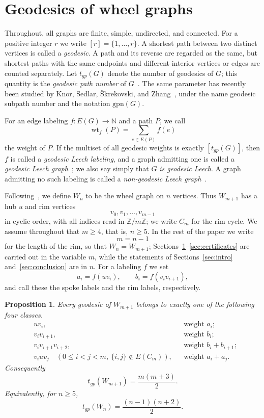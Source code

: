 \documentclass[11pt]{article}
\newtheorem{proposition}[theorem]{Proposition}
\theoremstyle{definition}
\theoremstyle{remark}
\numberwithin{equation}{section}
\newcommand{\N}{\mathbb{N}}
\newcommand{\Z}{\mathbb{Z}}
\newcommand{\wt}{\operatorname{wt}}
\begin{document}
\section{Geodesics of wheel graphs}\label{sec:wheels}

Throughout, all graphs are finite, simple, undirected, and connected. For a positive integer $r$ we write $[r]=\{1,\ldots,r\}$. A shortest path between two distinct vertices is called a \emph{geodesic}. A path and its reverse are regarded as the same, but shortest paths with the same endpoints and different interior vertices or edges are counted separately. Let $t_{gp}(G)$ denote the number of geodesics of $G$; this quantity is the \emph{geodesic path number} of $G$~\cite{VargheseEtAl2022,LakshmananManattu2025}. The same parameter has recently been studied by Knor, Sedlar, \v{S}krekovski, and Zhang~\cite{KnorEtAl2026}, under the name geodesic subpath number and the notation $\mathrm{gpn}(G)$.

For an edge labeling $f:E(G)\to\N$ and a path $P$, we call
\[
  \wt_f(P)=\sum_{e\in E(P)}f(e)
\]
the weight of $P$. If the multiset of all geodesic weights is exactly $[t_{gp}(G)]$, then $f$ is called a \emph{geodesic Leech labeling}, and a graph admitting one is called a \emph{geodesic Leech graph}~\cite{VargheseEtAl2022}; we also say simply that $G$ \emph{is geodesic Leech}. A graph admitting no such labeling is called a \emph{non-geodesic Leech graph}~\cite{LakshmananManattu2025}.

Following~\cite{LakshmananManattu2025}, we define $W_n$ to be the wheel graph on $n$ vertices. Thus $W_{m+1}$ has a hub $u$ and rim vertices
\[
  v_0,v_1,\ldots,v_{m-1}
\]
in cyclic order, with all indices read in $\Z/m\Z$; we write $C_m$ for the rim cycle. We assume throughout that $m\ge4$, that is, $n\ge5$. In the rest of the paper we write
\[
  m=n-1
\]
for the length of the rim, so that $W_n=W_{m+1}$; Sections~\ref{sec:wheels}--\ref{sec:certificates} are carried out in the variable $m$, while the statements of Sections~\ref{sec:intro} and~\ref{sec:conclusion} are in $n$. For a labeling $f$ we set
\[
  a_i=f(uv_i),\qquad b_i=f(v_iv_{i+1}),
\]
and call these the spoke labels and the rim labels, respectively.

\begin{proposition}\label{prop:wheel-geodesics}
Every geodesic of $W_{m+1}$ belongs to exactly one of the following four classes.
\begin{align*}
&uv_i, &&\text{weight }a_i;\\
&v_iv_{i+1}, &&\text{weight }b_i;\\
&v_iv_{i+1}v_{i+2}, &&\text{weight }b_i+b_{i+1};\\
&v_i u v_j\quad(0\le i<j<m,\ \{i,j\}\notin E(C_m)),
&&\text{weight }a_i+a_j.
\end{align*}
Consequently
\[
  t_{gp}(W_{m+1})=\frac{m(m+3)}2.
\]
Equivalently, for $n\ge5$,
\[
  t_{gp}(W_n)=\frac{(n-1)(n+2)}2.
\]
\end{proposition}
\end{document}
